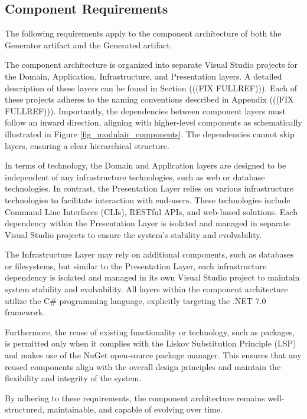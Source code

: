 \subsection{Component Requirements} \label{component_requirements}

The following requirements apply to the component architecture of both the Generator
artifact and the Generated artifact.

The component architecture is organized into separate Visual Studio projects for the
Domain, Application, Infrastructure, and Presentation layers. A detailed description of
these layers can be found in Section (((FIX FULLREF))). Each of these projects adheres to
the naming conventions described in Appendix (((FIX FULLREF))). Importantly, the
dependencies between component layers must follow an inward direction, aligning with
higher-level components as schematically illustrated in Figure
\ref{fig_modulair_components}. The dependencies cannot skip layers, ensuring a clear
hierarchical structure.

In terms of technology, the Domain and Application layers are designed to be independent
of any infrastructure technologies, such as web or database technologies. In contrast, the
Presentation Layer relies on various infrastructure technologies to facilitate interaction
with end-users. These technologies include Command Line Interfaces (CLIs), RESTful APIs,
and web-based solutions. Each dependency within the Presentation Layer is isolated and
managed in separate Visual Studio projects to ensure the system's stability and
evolvability.

The Infrastructure Layer may rely on additional components, such as databases or
filesystems, but similar to the Presentation Layer, each infrastructure dependency is
isolated and managed in its own Visual Studio project to maintain system stability and
evolvability. All layers within the component architecture utilize the C\# programming
language, explicitly targeting the .NET 7.0 framework.

Furthermore, the reuse of existing functionality or technology, such as packages, is
permitted only when it complies with the Liskov Substitution Principle (LSP) and makes use
of the NuGet open-source package manager. This ensures that any reused components align
with the overall design principles and maintain the flexibility and integrity of the
system.

By adhering to these requirements, the component architecture remains well-structured,
maintainable, and capable of evolving over time.
